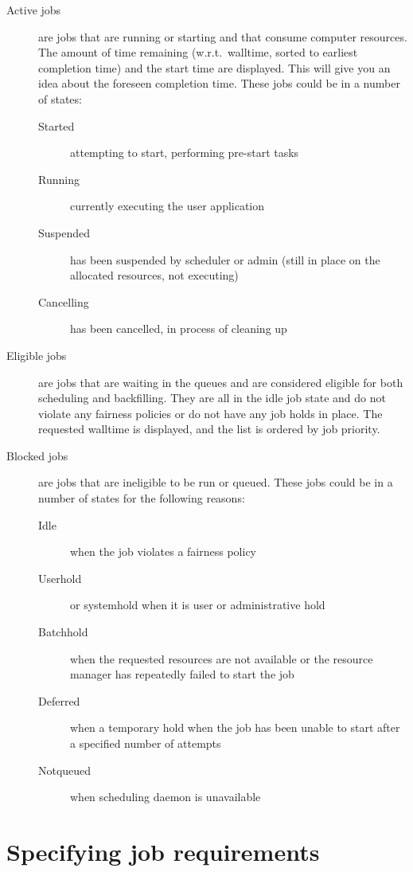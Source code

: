 \begin{description}
  \item[Active jobs] are jobs that are running or starting and that consume computer resources. The amount of time remaining (w.r.t.\ walltime, sorted to earliest completion time) and the start time are displayed. This will give you an idea about the foreseen completion time. These jobs could be in a number of states:

  \begin{description}
    \item[Started] attempting to start, performing pre-start tasks
    \item[Running] currently executing the user application
    \item[Suspended] has been suspended by scheduler or admin (still in place
      on the allocated resources, not executing)
    \item[Cancelling] has been cancelled, in process of cleaning up
  \end{description}

  \item[Eligible jobs] are jobs that are waiting in the queues and are
    considered eligible for both scheduling and backfilling.  They are all in
    the idle job state and do not violate any fairness policies or do not have
    any job holds in place. The requested walltime is displayed, and the list
    is ordered by job priority.
  \item[Blocked jobs] are jobs that are ineligible to be run or queued.  These
    jobs could be in a number of states for the following reasons:

  \begin{description}
    \item[Idle] when the job violates a fairness policy
    \item[Userhold] or systemhold when it is user or administrative hold
    \item[Batchhold] when the requested resources are not available or the resource manager has repeatedly failed to start the job
    \item[Deferred] when a temporary hold when the job has been unable to start after a specified number of attempts
    \item[Notqueued] when scheduling daemon is unavailable
  \end{description}
\end{description}

\section{Specifying job requirements}

